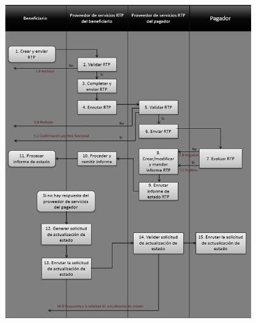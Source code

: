 \begin{figure}[H]
  \centering
  \includegraphics[width=0.95\textwidth, height=0.95\textheight, keepaspectratio]{Imagenes/Flujo.png}
  \label{fig:4corner}
\end{figure}


